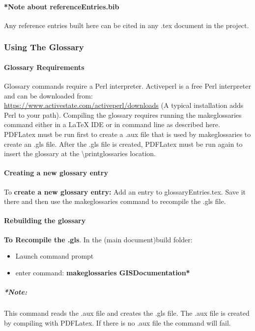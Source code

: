 \documentclass[class=book , crop=false]{standalone}
\begin{document}
\paragraph*{*Note about referenceEntries.bib}
{\footnotesize Any reference entries built here can be cited in any .tex document in the project.}

\subsubsection[Using The Glossary]{{\Large Using The Glossary}}
\paragraph{Glossary Requirements}
Glossary commands require a Perl interpreter.  Activeperl is a free Perl interpreter and can be downloaded from:\\ \href{https://www.activestate.com/activeperl/downloads}{https://www.activestate.com/activeperl/downloads}
{\tiny (A typical installation adds Perl to your path)}.  Compiling the glossary requires running the makeglossaries command either in a \LaTeX{} IDE or in command line as described here.  PDFLatex must be run first to create a .aux file that is used by makeglossaries to create an .gls file.  After the .gls file is created, PDFLatex must be run again to insert the glossary at the \textbackslash printglossaries location.
\paragraph{Creating a new glossary entry}
To \textbf{create a new glossary entry:} Add an entry to glossaryEntries.tex.  Save it there and then use the makeglossaries command to recompile the .gls file.
\paragraph{Rebuilding the glossary}
\textbf{To Recompile the .gls}.  In the (main document)build folder:
\begin{itemize}
\item Launch command prompt
\item enter command: \textbf{{\large makeglossaries GISDocumentation*}}
\end{itemize}
\subparagraph*{*Note:} {\footnotesize This command reads the .aux file and creates the .gls file.  The .aux file is created by compiling with PDFLatex.  If there is no .aux file the command will fail.}
\end{document}
